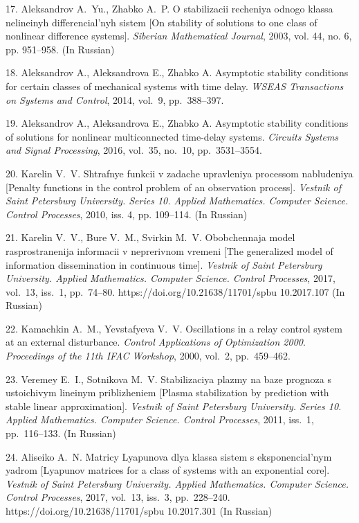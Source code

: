 {17. Aleksandrov A.~Yu., Zhabko A.~P. O stabilizacii recheniya
odnogo klassa nelineinyh differencial'nyh sistem [On stability of
solutions to one class of nonlinear difference systems].
\emph{Siberian Mathematical Journal}, 2003, vol. 44, no. 6, pp.
951--958. (In Russian)

18. Aleksandrov A., Aleksandrova E., Zhabko A. Asymptotic
stability conditions for certain classes of mechanical systems
with time delay. \emph{WSEAS Transactions on Systems and Control},
2014, vol.~9, pp.~388--397.

19. Aleksandrov A., Aleksandrova E., Zhabko A. Asymptotic
stability conditions of solutions for nonlinear multiconnected
time-delay systems. \emph{Circuits  Systems and Signal
Processing}, 2016, vol.~35, no.~10, pp.~3531--3554.

20. Karelin V.~V.  Shtrafnye funkcii v zadache upravleniya
processom nabludeniya [Penalty functions in the control problem of
an observation process]. \emph{Vestnik of Saint Petersburg
University. Series 10. Applied Mathematics. Computer Science.
Control Processes}, 2010, iss. 4, pp. 109--114. (In Russian)

21. Karelin V.~V., Bure V.~M., Svirkin M.~V. Obobchennaja model
rasprostranenija informacii v neprerivnom vremeni [The generalized
model of information dissemination in continuous time].
\textit{Vestnik of Saint Petersburg University. Applied
Mathematics. Computer Science. Control Processes}, 2017, vol.~13,
iss.~1, pp.~74--80. https://doi.org/10.21638/11701/spbu
10.2017.107 (In Russian)

22. Kamachkin A.~M., Yevstafyeva V.~V.   Oscillations in a relay
control system at an external disturbance.  \emph{Control
Applications of Optimization 2000}. \emph{Proceedings of the 11th
IFAC Workshop}, 2000, vol.~2, pp.~459--462.

23. Veremey E.~I., Sotnikova M.~V. Stabilizaciya plazmy na baze
prognoza s ustoichivym lineinym priblizheniem [Plasma
stabilization by prediction with stable linear approximation].
\emph{Vestnik of Saint Petersburg University. Series 10. Applied
Mathematics. Computer Science. Control Processes}, 2011, iss.~1,
pp.~116--133. (In Russian)

24. Aliseiko A.~N. Matricy Lyapunova dlya klassa sistem s
eksponencial'nym yadrom [Lyapunov matrices for a class of systems
with an exponential core]. \textit{Vestnik of Saint Petersburg
University. Applied Mathematics. Computer Science. Control
Processes}, 2017, vol.~13, iss.~3, pp.~228--240.
https://doi.org/10.21638/11701/spbu 10.2017.301 (In Russian)

}
